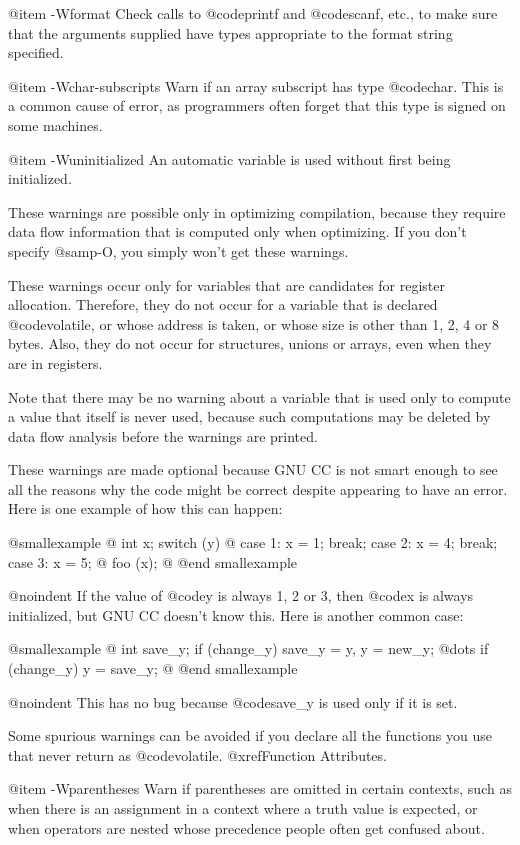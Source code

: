 {@item -Wformat
Check calls to @code{printf} and @code{scanf}, etc., to make sure that
the arguments supplied have types appropriate to the format string
specified.

@item -Wchar-subscripts
Warn if an array subscript has type @code{char}.  This is a common cause
of error, as programmers often forget that this type is signed on some
machines.

@item -Wuninitialized
An automatic variable is used without first being initialized.

These warnings are possible only in optimizing compilation,
because they require data flow information that is computed only
when optimizing.  If you don't specify @samp{-O}, you simply won't
get these warnings.

These warnings occur only for variables that are candidates for
register allocation.  Therefore, they do not occur for a variable that
is declared @code{volatile}, or whose address is taken, or whose size
is other than 1, 2, 4 or 8 bytes.  Also, they do not occur for
structures, unions or arrays, even when they are in registers.

Note that there may be no warning about a variable that is used only
to compute a value that itself is never used, because such
computations may be deleted by data flow analysis before the warnings
are printed.

These warnings are made optional because GNU CC is not smart
enough to see all the reasons why the code might be correct
despite appearing to have an error.  Here is one example of how
this can happen:

@smallexample
@{
  int x;
  switch (y)
    @{
    case 1: x = 1;
      break;
    case 2: x = 4;
      break;
    case 3: x = 5;
    @}
  foo (x);
@}
@end smallexample

@noindent
If the value of @code{y} is always 1, 2 or 3, then @code{x} is
always initialized, but GNU CC doesn't know this.  Here is
another common case:

@smallexample
@{
  int save_y;
  if (change_y) save_y = y, y = new_y;
  @dots{}
  if (change_y) y = save_y;
@}
@end smallexample

@noindent
This has no bug because @code{save_y} is used only if it is set.

Some spurious warnings can be avoided if you declare all the functions
you use that never return as @code{volatile}.  @xref{Function
Attributes}.

@item -Wparentheses
Warn if parentheses are omitted in certain contexts, such
as when there is an assignment in a context where a truth value
is expected, or when operators are nested whose precedence people
often get confused about.

}
